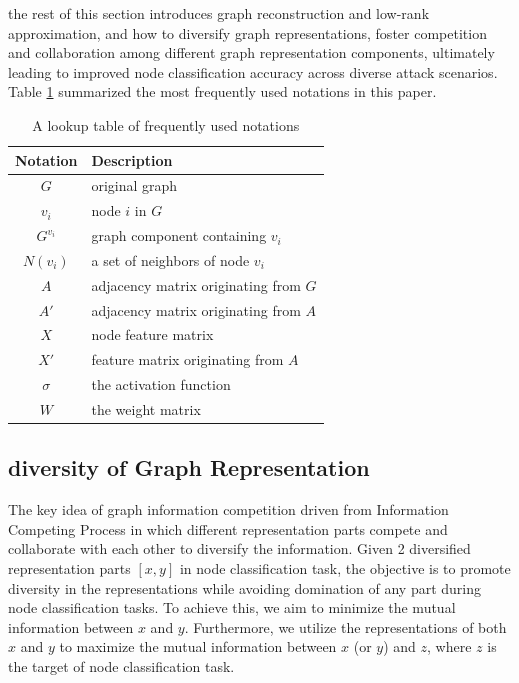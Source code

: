 \documentclass[conference]{IEEEtran}
\begin{document}
the rest of this section introduces graph reconstruction and low-rank approximation, and how to diversify graph representations, foster competition and collaboration among different graph representation components, ultimately leading to improved node classification accuracy across diverse attack scenarios. Table \ref{lookup-table} summarized the most frequently used notations in this paper.



\begin{table}
    \centering
    \caption{A lookup table of frequently used notations}
    \begin{tabular}{c|l}
    \hline
    Notation & Description \\
    \hline
     $G$  & original graph\\
     \hline
     $v_i$  & node $i$ in $G$ \\
     \hline
     $G^{v_i}$ & graph component containing $v_i$ \\
     \hline
     $N(v_i)$ & a set of neighbors of node $v_i$\\
     \hline
       $A$  & adjacency matrix originating from $G$ \\
    \hline
     $A'$ & adjacency matrix originating from $A$\\
     \hline
     $X$  & node feature matrix  \\
    \hline
    $X'$ & feature matrix originating from $A$\\
     \hline
     $\sigma$  & the activation function  \\
    \hline
     $W$  & the weight matrix  \\
    \hline
    \end{tabular}
    \label{lookup-table}
\end{table}


\subsection{diversity of Graph Representation}

The key idea of graph information competition driven from Information Competing Process \cite{hu2019information} in which different representation parts compete and collaborate with each other to diversify the information. Given 2 diversified representation parts $[x,y]$ in node classification task, the objective is to promote diversity in the representations while avoiding domination of any part during node classification tasks. To achieve this, we aim to minimize the mutual information between $x$ and $y$. Furthermore, we utilize the representations of both $x$ and $y$ to maximize the mutual information between $x$ (or $y$) and $z$, where $z$ is the target of node classification task.
\end{document}
